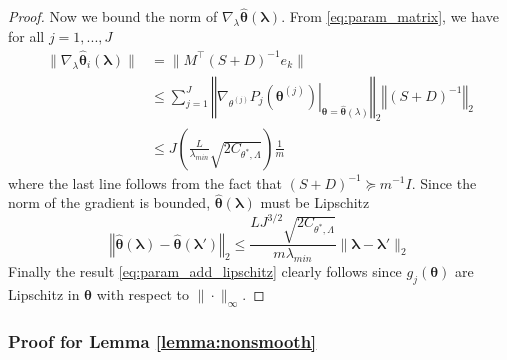 \documentclass[12pt]{article}
\begin{document}
\begin{proof}
	Now we bound the norm of $\nabla_\lambda \hat{\boldsymbol{\theta}}(\boldsymbol{\lambda})$. From \eqref{eq:param_matrix}, we have for all $j=1,...,J$
	\begin{align}
	\|\nabla_{\lambda}\hat{\boldsymbol{\theta}}_{i}(\boldsymbol{\lambda})\| & =  \|M^{\top}\left(S+D\right)^{-1}e_{k}\|\\
	& \le \sum_{j=1}^{J}\left\Vert \left.\nabla_{\theta^{(j)}}P_{j}(\boldsymbol{\theta}^{(j)})\right|_{\boldsymbol{\theta}=\hat{\boldsymbol{\theta}}(\lambda)}\right\Vert _{2}\left\Vert \left(S+D\right)^{-1}\right\Vert _{2}\\
	& \le  J\left(\frac{L}{\lambda_{min}}\sqrt{2C_{\theta^{*},\Lambda}}\right)\frac{1}{m}
	\end{align}
	where the last line follows from the fact that $(S + D)^{-1} \succeq m^{-1}I$. Since the norm of the gradient is bounded, $\hat{\boldsymbol{\theta}}(\boldsymbol{\lambda})$ must be Lipschitz
	\begin{equation}
	\left\Vert \hat{\boldsymbol{\theta}}(\boldsymbol{\lambda})-\hat{\boldsymbol{\theta}}(\boldsymbol{\lambda}')\right\Vert _{2}\le\frac{LJ^{3/2}\sqrt{2C_{\theta^{*},\Lambda}}}{m\lambda_{min}}\|\boldsymbol{\lambda}-\boldsymbol{\lambda}'\|_{2}
	\end{equation}
	Finally the result \eqref{eq:param_add_lipschitz} clearly follows since $g_j(\boldsymbol{\theta})$ are Lipschitz in $\boldsymbol{\theta}$ with respect to $\| \cdot \|_\infty$.
\end{proof}

\subsubsection{Proof for Lemma \ref{lemma:nonsmooth}}
\end{document}
